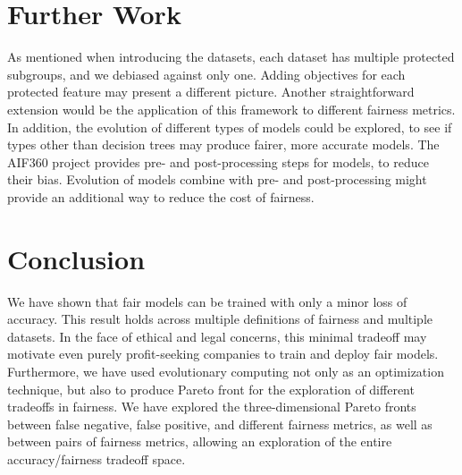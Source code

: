\documentclass[10pt]{acmart}
\begin{document}
\section{Further Work}
As mentioned when introducing the datasets, each dataset has multiple protected subgroups, and we debiased against only one. Adding objectives for each protected feature may present a different picture. Another straightforward extension would be the application of this framework to different fairness metrics. In addition, the evolution of different types of models could be explored, to see if types other than decision trees may produce fairer, more accurate models. The AIF360 project provides pre- and post-processing steps for models, to reduce their bias. Evolution of models combine with pre- and post-processing might provide an additional way to reduce the cost of fairness.

\section{Conclusion}
We have shown that fair models can be trained with only a minor loss of accuracy. This result holds across multiple definitions of fairness and multiple datasets. In the face of ethical and legal concerns, this minimal tradeoff may motivate even purely profit-seeking companies to train and deploy fair models. Furthermore, we have used evolutionary computing not only as an optimization technique, but also to produce Pareto front for the exploration of different tradeoffs in fairness. We have explored the three-dimensional Pareto fronts between false negative, false positive, and different fairness metrics, as well as between pairs of fairness metrics, allowing an exploration of the entire accuracy/fairness tradeoff space.



\end{document}
